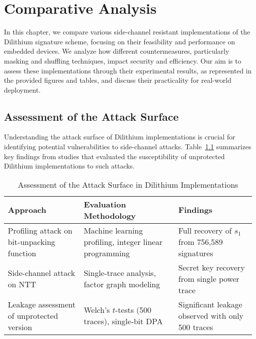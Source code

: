 \chapter{Comparative Analysis}
\thispagestyle{chapterstart}

In this chapter, we compare various side-channel resistant implementations of the Dilithium signature scheme, focusing on their feasibility and performance on embedded devices. We analyze how different countermeasures, particularly masking and shuffling techniques, impact security and efficiency. Our aim is to assess these implementations through their experimental results, as represented in the provided figures and tables, and discuss their practicality for real-world deployment.

\section{Assessment of the Attack Surface}

Understanding the attack surface of Dilithium implementations is crucial for identifying potential vulnerabilities to side-channel attacks. Table~\ref{tab:attack_surface} summarizes key findings from studies that evaluated the susceptibility of unprotected Dilithium implementations to such attacks.

\begin{table}[ht]
    \centering
    \renewcommand{\arraystretch}{1.2}
    \caption{Assessment of the Attack Surface in Dilithium Implementations}
    \label{tab:attack_surface}
    \begin{tabularx}{\textwidth}{|X|X|X|}
        \hline
        \textbf{Approach}                                             & \textbf{Evaluation Methodology}                        & \textbf{Findings}                                 \\ \hline
        Profiling attack on bit-unpacking function \cite{Marzougui22} & Machine learning profiling, integer linear programming & Full recovery of $s_1$ from 756,589 signatures    \\ \hline
        Side-channel attack on NTT \cite{Pessl19}                     & Single-trace analysis, factor graph modeling           & Secret key recovery from single power trace       \\ \hline
        Leakage assessment of unprotected version \cite{Migliore19}   & Welch's $t$-tests (500 traces), single-bit DPA         & Significant leakage observed with only 500 traces \\ \hline
    \end{tabularx}
\end{table}

